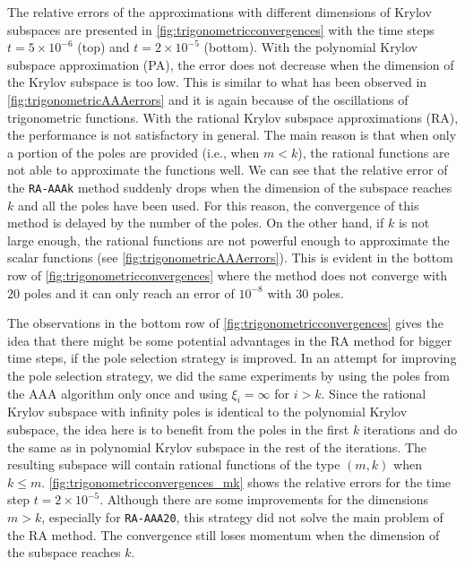 The relative errors of the approximations with different dimensions of Krylov subspaces
are presented in \autoref{fig:trigonometricconvergences} with the time steps
$t=5 \times 10^{-6}$ (top) and $t=2 \times 10^{-5}$ (bottom).
With the polynomial Krylov subspace approximation (PA), the error does not decrease when
the dimension of the Krylov subspace is too low. This is similar to what has been
observed in \autoref{fig:trigonometricAAAerrors} and it is again because of the
oscillations of trigonometric functions.
With the rational Krylov subspace approximations (RA), the performance is not satisfactory in general.
The main reason is that when only a portion of the poles are provided (i.e., when $m < k$),
the rational functions are not able to approximate the functions well. We can see that
the relative error of the \texttt{RA-AAAk} method suddenly drops when the dimension of
the subspace reaches $k$ and all the poles have been used. For this reason, the convergence
of this method is delayed by the number of the poles. On the other hand, if $k$ is not large
enough, the rational functions are not powerful enough to approximate the scalar functions
(see \autoref{fig:trigonometricAAAerrors}).
This is evident in the bottom row of \autoref{fig:trigonometricconvergences} where the method
does not converge with $20$ poles and it can only reach an error of $10^{-8}$ with $30$ poles.

The observations in the bottom row of \autoref{fig:trigonometricconvergences} gives the
idea that there might be some potential advantages in the RA method for bigger time steps,
if the pole selection strategy is improved. In an attempt for improving the pole selection
strategy, we did the same experiments by using the poles from the AAA algorithm only once
and using $\xi_i = \infty$ for $i > k$. Since the rational Krylov subspace with infinity
poles is identical to the polynomial Krylov subspace, the idea here is to benefit from
the poles in the first $k$ iterations and do the same as in polynomial Krylov subspace
in the rest of the iterations. The resulting subspace will contain rational functions
of the type $(m, k)$ when $k \le m$.
\autoref{fig:trigonometricconvergences_mk} shows the relative errors for the time step
$t = 2 \times 10^{-5}$. Although there are some improvements for the dimensions $m > k$,
especially for \texttt{RA-AAA20}, this strategy did not solve the main problem of the
RA method. The convergence still loses momentum when the dimension of the subspace
reaches $k$.

